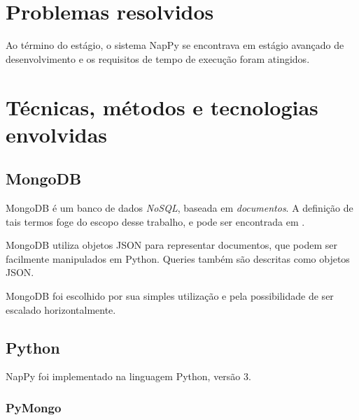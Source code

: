


\section{Problemas resolvidos}

Ao término do estágio, o sistema NapPy se encontrava em estágio
avançado de desenvolvimento e os requisitos de tempo de execução
foram atingidos.



\section{Técnicas, métodos e tecnologias envolvidas}

\subsection{MongoDB}

MongoDB\cite{Mongo} é um banco de dados \emph{NoSQL}, baseada em \emph{documentos}. 
A definição de tais termos foge do escopo desse trabalho, e pode
ser encontrada em \cite{NoSQL}.

MongoDB utiliza objetos JSON para representar documentos, que podem ser
facilmente manipulados em Python. Queries também são descritas
como objetos JSON.

MongoDB foi escolhido por sua simples utilização e pela
possibilidade de ser escalado horizontalmente.

\subsection{Python}

NapPy foi implementado na linguagem Python, versão 3.

\subsubsection{PyMongo}

